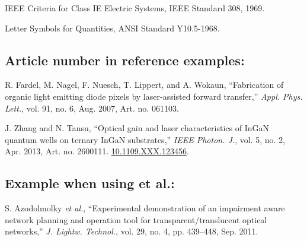 \documentclass[journal]{IEEEtai}
\begin{document}
\begin{thebibliography}{34}
\setcounter{enumiv}{29}
\bibitem{}IEEE Criteria for Class IE Electric Systems, IEEE Standard 308, 1969.

\bibitem{} Letter Symbols for Quantities, ANSI Standard Y10.5-1968.
\end{thebibliography}\vspace*{-6pt}

\subsection*{Article number in reference examples:}\vspace*{-18pt}

\begin{thebibliography}{34}

\setcounter{enumiv}{31}

\bibitem{}R. Fardel, M. Nagel, F. Nuesch, T. Lippert, and A. Wokaun, ``Fabrication of organic light emitting diode pixels by laser-assisted forward transfer,'' {\em Appl. Phys. Lett.}, vol. 91, no. 6, Aug. 2007, Art. no. 061103. 

\bibitem{} J. Zhang and N. Tansu, ``Optical gain and laser characteristics of InGaN quantum wells on ternary InGaN substrates,'' {\em IEEE Photon. J.}, vol. 5, no. 2, Apr. 2013, Art. no. 2600111.  \href{https://dx.doi.org/10.1109.XXX.123456}{10.1109.XXX.123456}.
\end{thebibliography}\vspace*{-6pt}

\subsection*{Example when using et al.:}\vspace*{-18pt}

\begin{thebibliography}{34}
\setcounter{enumiv}{33}

\bibitem{}S. Azodolmolky {\em et al.}, ``Experimental demonstration of an impairment aware network planning and operation tool for transparent/translucent optical networks,'' {\em J. Lightw. Technol.}, vol. 29, no. 4, pp. 439--448, Sep. 2011.
\end{thebibliography}
\end{document}

